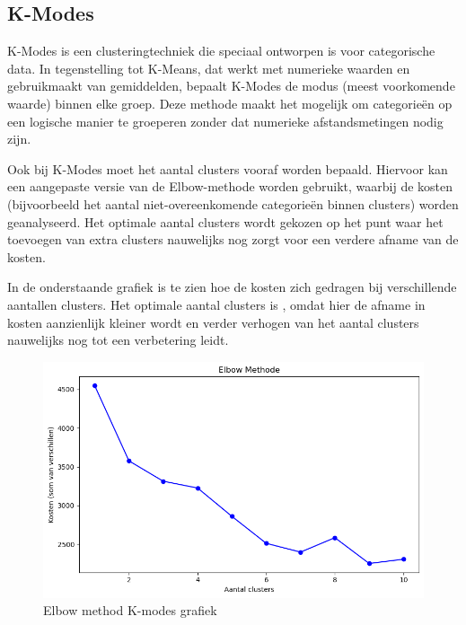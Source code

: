 \subsection*{K-Modes}

K-Modes is een clusteringtechniek die speciaal ontworpen is voor categorische data. In tegenstelling tot K-Means, dat werkt met numerieke waarden en gebruikmaakt van gemiddelden, bepaalt K-Modes de modus (meest voorkomende waarde) binnen elke groep. Deze methode maakt het mogelijk om categorieën op een logische manier te groeperen zonder dat numerieke afstandsmetingen nodig zijn.

\vspace{1em}

Ook bij K-Modes moet het aantal clusters vooraf worden bepaald. Hiervoor kan een aangepaste versie van de Elbow-methode worden gebruikt, waarbij de kosten (bijvoorbeeld het aantal niet-overeenkomende categorieën binnen clusters) worden geanalyseerd. Het optimale aantal clusters wordt gekozen op het punt waar het toevoegen van extra clusters nauwelijks nog zorgt voor een verdere afname van de kosten.

\vspace{1em}

In de onderstaande grafiek is te zien hoe de kosten zich gedragen bij verschillende aantallen clusters. Het optimale aantal clusters is , omdat hier de afname in kosten aanzienlijk kleiner wordt en verder verhogen van het aantal clusters nauwelijks nog tot een verbetering leidt.


\begin{figure}[H]
    \centering
    \includegraphics[width=1\linewidth]{images/Kmodes/ElbowmethodKmodes}
    \caption{Elbow method K-modes grafiek}
    \label{fig:ElbowMethodKmodes}
\end{figure}

